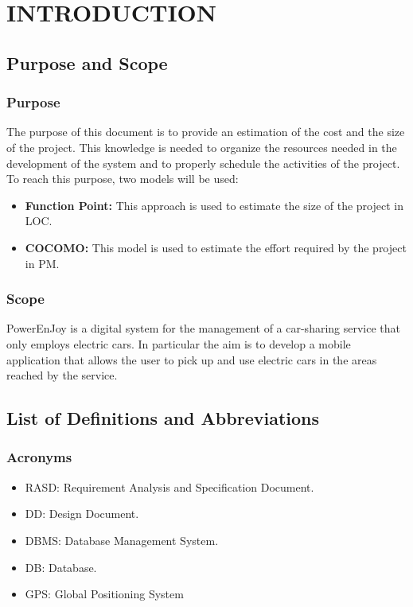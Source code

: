 \section{INTRODUCTION}
\subsection{Purpose and Scope}
\subsubsection{Purpose}
The purpose of this document is to provide an estimation of the cost and the size of the project. This knowledge is needed to organize the resources needed in the development of the system and to properly schedule the activities of the project.\newline
To reach this purpose, two models will be used:
\begin{itemize}
\item \textbf{Function Point:} This approach is used to estimate the size of the project in LOC.
\item \textbf{COCOMO:} This model is used to estimate the effort required by the project in PM.
\end{itemize}

\subsubsection{Scope}
PowerEnJoy is a digital system for the management of a car-sharing service that only employs electric cars. In particular the aim is to develop a mobile application that allows the user to pick up and use electric cars in the areas reached by the service.

\subsection{List of Definitions and Abbreviations} 
\subsubsection{Acronyms}
\begin{itemize}
\item RASD: Requirement Analysis and Specification Document.
\item DD: Design Document.
\item DBMS: Database Management System.
\item DB: Database.

\item GPS: Global Positioning System

\end{itemize}

